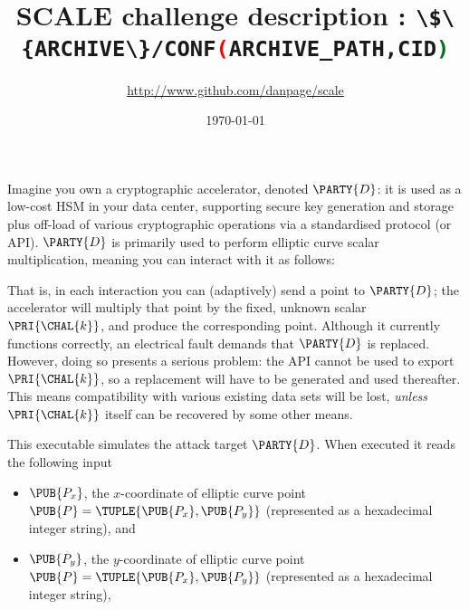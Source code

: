 \documentclass[crop={false},multi={true},tikz={true}]{standalone}
\begin{document}

\ifstandalone
\author{\url{http://www.github.com/danpage/scale}}
\title{\Large SCALE challenge description : \lstinline[language={bash}]|\$\{ARCHIVE\}/CONF(ARCHIVE_PATH,CID)|}
\date{\today}

\maketitle
\fi



Imagine you own a cryptographic accelerator, denoted $\PARTY{D}$: it is used
as a low-cost HSM in your data center, supporting secure key generation and 
storage plus off-load of various cryptographic operations via a standardised 
protocol (or API).  $\PARTY{D}$ is primarily used to perform elliptic curve
scalar multiplication, meaning you can interact with it as follows:

\begin{center}

\end{center}

\noindent
That is, in each interaction you can (adaptively) send 
a point
to $\PARTY{D}$; the accelerator will
multiply that point by the fixed, unknown scalar $\PRI{\CHAL{k}}$,
and produce 
the corresponding point.
Although it currently functions correctly, an electrical fault demands that
$\PARTY{D}$ is replaced.  However, doing so presents a serious problem: the 
API cannot be used to export $\PRI{\CHAL{k}}$, so a replacement will have 
to be generated and used thereafter.  This means compatibility with various
existing data sets will be lost, {\em unless} $\PRI{\CHAL{k}}$ itself can 
be recovered by some other means.



This executable simulates the attack target $\PARTY{D}$.  When executed it 
reads the following input

\begin{itemize}
\item $\PUB{P_x}$,
      the $x$-coordinate of elliptic curve point $\PUB{P} = \TUPLE{ \PUB{P_x}, \PUB{P_y} }$
      (represented as a                   hexadecimal integer string),
      and
\item $\PUB{P_y}$,
      the $y$-coordinate of elliptic curve point $\PUB{P} = \TUPLE{ \PUB{P_x}, \PUB{P_y} }$
      (represented as a                   hexadecimal integer string),
\end{itemize}
\end{document}
